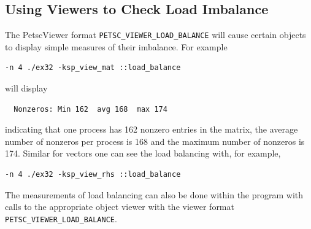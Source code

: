 {{{\subsection{Using Viewers to Check Load Imbalance}

The PetscViewer format \lstinline{PETSC_VIEWER_LOAD_BALANCE} will cause certain objects to display simple measures of their imbalance. For example
\begin{lstlisting}
-n 4 ./ex32 -ksp_view_mat ::load_balance
\end{lstlisting}
will display
\begin{lstlisting}
  Nonzeros: Min 162  avg 168  max 174
\end{lstlisting}
indicating that one process has 162 nonzero entries in the matrix, the average number of nonzeros per process is 168 and the maximum number of nonzeros is 174.
Similar for vectors one can see the load balancing with, for example,
\begin{lstlisting}
-n 4 ./ex32 -ksp_view_rhs ::load_balance
\end{lstlisting}
The measurements of load balancing can also be done within the program with calls to the appropriate object viewer with the viewer format \lstinline{PETSC_VIEWER_LOAD_BALANCE}.



}}}
